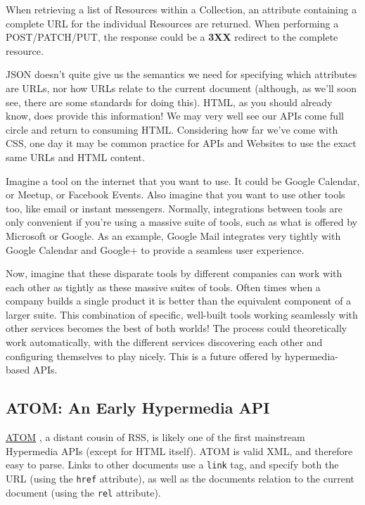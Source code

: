 When retrieving a list of Resources within a Collection, an attribute containing a complete URL for the individual Resources are returned. When performing a POST/PATCH/PUT, the response could be a \textbf{3XX} redirect to the complete resource.

JSON doesn't quite give us the semantics we need for specifying which attributes are URLs, nor how URLs relate to the current document (although, as we'll soon see, there are some standards for doing this). HTML, as you should already know, does provide this information! We may very well see our APIs come full circle and return to consuming HTML. Considering how far we've come with CSS, one day it may be common practice for APIs and Websites to use the exact same URLs and HTML content.

Imagine a tool on the internet that you want to use. It could be Google Calendar, or Meetup, or Facebook Events. Also imagine that you want to use other tools too, like email or instant messengers. Normally, integrations between tools are only convenient if you're using a massive suite of tools, such as what is offered by Microsoft or Google. As an example, Google Mail integrates very tightly with Google Calendar and Google+ to provide a seamless user experience.

Now, imagine that these disparate tools by different companies can work with each other as tightly as these massive suites of tools. Often times when a company builds a single product it is better than the equivalent component of a larger suite. This combination of specific, well-built tools working seamlessly with other services becomes the best of both worlds! The process could theoretically work automatically, with the different services discovering each other and configuring themselves to play nicely. This is a future offered by hypermedia-based APIs.

\subsection{ATOM: An Early Hypermedia API}

\href{https://en.wikipedia.org/wiki/Atom\_\%28standard\%29}{ATOM} \cite{HYPERATOM}, a distant cousin of RSS, is likely one of the first mainstream Hypermedia APIs (except for HTML itself). ATOM is valid XML, and therefore easy to parse. Links to other documents use a \texttt{link} tag, and specify both the URL (using the \texttt{href} attribute), as well as the documents relation to the current document (using the \texttt{rel} attribute).

